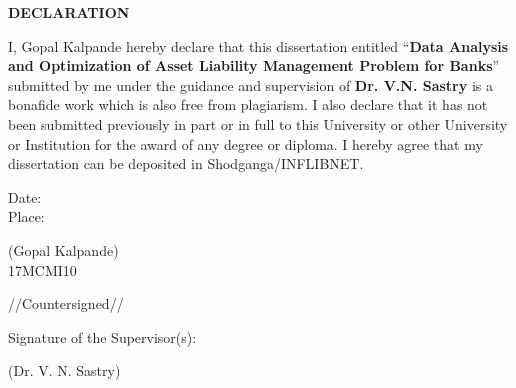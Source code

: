 \begin{center}
\textbf{\large DECLARATION}
\end{center}
\vspace{.50in}
I, Gopal Kalpande hereby declare that this dissertation entitled 
``\textbf{Data Analysis and Optimization of Asset Liability Management Problem for Banks}'' 
submitted by me under the guidance and supervision of \textbf{Dr. V.N. Sastry} is a bonafide work which is also free from plagiarism. 
I also declare that it has not been submitted previously in part or in full to this University or other University or Institution for the award of any degree or diploma. I hereby agree that my dissertation can be deposited in Shodganga/INFLIBNET.

\vspace{1in}

\noindent
\parbox[t]{3in}
{\raggedright
Date:\\
Place:\\
}
\parbox[t]{3in}
{
\raggedleft 
(Gopal Kalpande)\\
17MCMI10\\
}
        \vspace*{2.5cm}\centerline{//Countersigned//}

        \noindent%
        Signature of the Supervisor(s):

        \vspace*{1.5cm}\noindent(Dr. V. N. Sastry)
        
